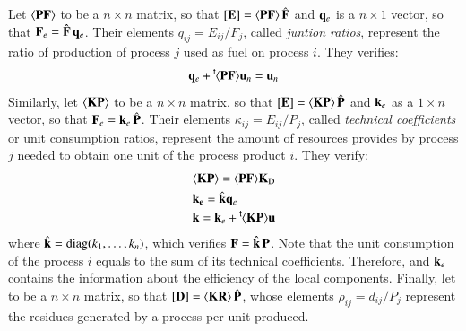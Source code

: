 \documentclass{ecos2018}
\begin{document}
Let $\langle \textbf{PF} \rangle$ to be a $n \times n$ matrix, so that $\left[ \textbf{E} \right]=\langle \textbf{PF} \rangle\,\hat{\mathbf{F}}$ and $\mathbf{q}_e$ is a $n \times 1$ vector, so that $\mathbf{F}_e=\hat{\mathbf{F}}\,\mathbf{q}_e$. Their elements $q_{ij}=E_{ij}/F_j$, called \emph{juntion ratios}, represent the ratio of production of process $j$ used as fuel on process $i$. They verifies:
\begin{equation}
\label{eq:vmqe}
\mathbf{q}_e+\prescript{\smash{\mathsf{t}}}{}{\mskip-1mu}\langle \textbf{PF} \rangle\mathbf{u}_n=\mathbf{u}_n
\end{equation}
Similarly, let   $\langle \textbf{KP} \rangle$ to be a $n\times n$ matrix, so that $\left[ \textbf{E} \right]=\langle \textbf{KP} \rangle\,\hat{\mathbf{P}}$ and $\mathbf{k}_e$ as a $1 \times n$ vector, so that $\mathbf{F}_e=\mathbf{k}_e\,\hat{\mathbf{P}}$. Their elements $\kappa_{ij}=E_{ij}/P_j$, called \emph{technical coefficients} or unit consumption ratios, represent the amount of resources  provides by process $j$ needed to obtain one unit of the process product $i$. They verify:
\begin{align}
&\langle \textbf{KP} \rangle=\langle \textbf{PF} \rangle\mathbf{K}_\mathrm{D} \\
&\mathbf{k_e}=\hat{\mathbf{k}} \mathbf{q}_e \\
&\mathbf{k}=\mathbf{k}_e+\prescript{\smash{\mathsf{t}}}{}{\mskip-1mu}\langle \textbf{KP} \rangle\mathbf{u} \label{eq:vke}
\end{align}
where $\hat{\mathbf{k}}=\text{diag}(k_1,\ldots,k_n)$, which verifies $\mathbf{F}=\hat{\mathbf{k}}\,\mathbf{P}$. Note that the unit consumption of the process $i$ equals to the sum of its technical coefficients. Therefore,  and $\mathbf{k}_e$ contains the information about the efficiency of the local components.
Finally, let  to be a $n\times n$ matrix, so that $\left[ \textbf{D} \right]=\langle \textbf{KR} \rangle\,\hat{\mathbf{P}}$, whose elements $\rho_{ij}=d_{ij}/P_j$ represent the residues generated by a process per unit produced.
\end{document}
